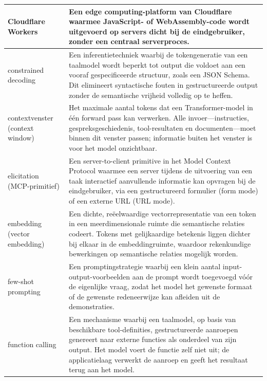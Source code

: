 \begin{longtable}{p{} p{}}
Cloudflare Workers &
    Een edge computing-platform van Cloudflare waarmee JavaScript- of WebAssembly-code wordt uitgevoerd op servers dicht bij de eindgebruiker, zonder een centraal serverproces. \\
\midrule

constrained decoding &
    Een inferentietechniek waarbij de tokengeneratie van een taalmodel wordt beperkt tot output die voldoet aan een vooraf gespecificeerde structuur, zoals een JSON Schema. Dit elimineert syntactische fouten in gestructureerde output zonder de semantische vrijheid volledig op te heffen. \\
\midrule

contextvenster \newline \small(context window) &
    Het maximale aantal tokens dat een Transformer-model in één forward pass kan verwerken. Alle invoer—instructies, gespreksgeschiedenis, tool-resultaten en documenten—moet binnen dit venster passen; informatie buiten het venster is voor het model onzichtbaar. \\
\midrule

elicitation \newline \small(MCP-primitief) &
    Een server-to-client primitive in het Model Context Protocol waarmee een server tijdens de uitvoering van een taak interactief aanvullende informatie kan opvragen bij de eindgebruiker, via een gestructureerd formulier (form mode) of een externe URL (URL mode). \\
\midrule

embedding \newline \small(vector embedding) &
    Een dichte, reëelwaardige vectorrepresentatie van een token in een meerdimensionale ruimte die semantische relaties codeert. Tokens met gelijkaardige betekenis liggen dichter bij elkaar in de embeddingruimte, waardoor rekenkundige bewerkingen op semantische relaties mogelijk worden. \\
\midrule

few-shot prompting &
    Een promptingstrategie waarbij een klein aantal input-output-voorbeelden aan de prompt wordt toegevoegd vóór de eigenlijke vraag, zodat het model het gewenste formaat of de gewenste redeneerwijze kan afleiden uit de demonstraties. \\
\midrule

function calling &
    Een mechanisme waarbij een taalmodel, op basis van beschikbare tool-definities, gestructureerde aanroepen genereert naar externe functies als onderdeel van zijn output. Het model voert de functie zelf niet uit; de applicatielaag verwerkt de aanroep en geeft het resultaat terug aan het model. \\
\midrule


\end{longtable}
